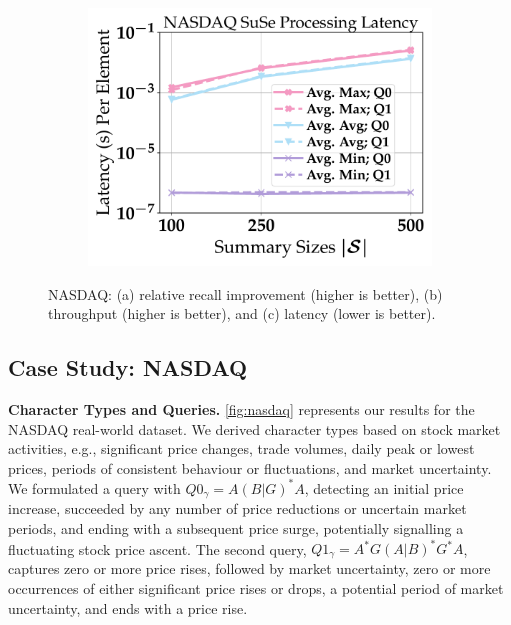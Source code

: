 \begin{figure}[t]
	\begin{subfigure}{.32\linewidth}
		\centering
		\includegraphics[width=1.0\linewidth]{revision_plots/NASDAQ_latency_lineplot.pdf}
		\vspace{-15pt}
		\caption{}
		\label{plot:nasdaq_latency}
	\end{subfigure}
    \vspace{-1em}
	\caption{NASDAQ: (a) relative recall improvement (higher is better), (b) throughput (higher is better), and (c) latency (lower is better).}
	\label{fig:nasdaq}
	\vspace{-1em}
\end{figure}

\subsection{Case Study: NASDAQ}
\label{subsec:nasdaq}
\textbf{Character Types and Queries.} \autoref{fig:nasdaq} represents our
results for the NASDAQ real-world dataset. We derived character types based on
stock market activities, e.g., significant price changes, trade volumes, daily
peak or lowest prices,
periods of consistent behaviour or fluctuations, and market uncertainty. We
formulated a query with $Q0_\gamma =
A(B|G)^*A$, detecting an initial price increase, succeeded by any number of
price reductions or uncertain market periods, and ending with a subsequent
price surge, potentially signalling a fluctuating stock price ascent. The
second query, $Q1_\gamma = A^*G(A|B)^*G^*A$, captures zero or more price
rises,
followed by market uncertainty, zero or more occurrences of either significant
price rises or drops, a potential period of market uncertainty, and ends with a
price rise.


